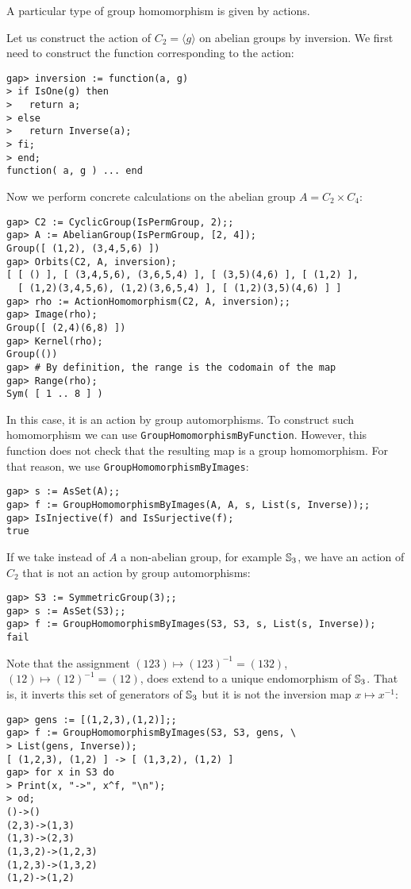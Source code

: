 A particular type of group homomorphism is given by 
actions.

\begin{example}
Let us construct the action of 
$C_2=\langle g\rangle$ on abelian groups by inversion. 
We first need to construct the function
corresponding to the action: 
\begin{lstlisting}
gap> inversion := function(a, g)
> if IsOne(g) then
>   return a;
> else
>   return Inverse(a);
> fi;
> end;
function( a, g ) ... end
\end{lstlisting}
Now we perform concrete calculations 
on the abelian group $A=C_2\times C_4$: 
\begin{lstlisting}
gap> C2 := CyclicGroup(IsPermGroup, 2);;
gap> A := AbelianGroup(IsPermGroup, [2, 4]);
Group([ (1,2), (3,4,5,6) ])
gap> Orbits(C2, A, inversion);
[ [ () ], [ (3,4,5,6), (3,6,5,4) ], [ (3,5)(4,6) ], [ (1,2) ],
  [ (1,2)(3,4,5,6), (1,2)(3,6,5,4) ], [ (1,2)(3,5)(4,6) ] ]
gap> rho := ActionHomomorphism(C2, A, inversion);;
gap> Image(rho);
Group([ (2,4)(6,8) ])
gap> Kernel(rho);
Group(())
gap> # By definition, the range is the codomain of the map   
gap> Range(rho);
Sym( [ 1 .. 8 ] )
\end{lstlisting}
In this case, it is an action by group automorphisms. To construct
such homomorphism we can use 
\lstinline{GroupHomomorphismByFunction}. However, 
this function does not check that the resulting map is a group homomorphism.
For that reason, we use \lstinline{GroupHomomorphismByImages}:
\begin{lstlisting}
gap> s := AsSet(A);;
gap> f := GroupHomomorphismByImages(A, A, s, List(s, Inverse));;
gap> IsInjective(f) and IsSurjective(f);
true
\end{lstlisting}

If we take instead of $A$ a non-abelian group, for example $\mathbb{S}_3$, we have an action 
of $C_2$ that is not an action by group automorphisms:
\begin{lstlisting}
gap> S3 := SymmetricGroup(3);;
gap> s := AsSet(S3);;
gap> f := GroupHomomorphismByImages(S3, S3, s, List(s, Inverse));
fail
\end{lstlisting}
Note that the assignment $(123)\mapsto (123)^{-1}=(132)$, $(12)\mapsto (12)^{-1}=(12)$,  does extend to a unique endomorphism of $\mathbb{S}_3$.
That is, it inverts this set of generators of $\mathbb{S}_3$ but it is not the inversion map $x\mapsto x^{-1}$:
\begin{lstlisting}
gap> gens := [(1,2,3),(1,2)];;
gap> f := GroupHomomorphismByImages(S3, S3, gens, \ 
> List(gens, Inverse));
[ (1,2,3), (1,2) ] -> [ (1,3,2), (1,2) ]
gap> for x in S3 do
> Print(x, "->", x^f, "\n");
> od;
()->()
(2,3)->(1,3)
(1,3)->(2,3)
(1,3,2)->(1,2,3)
(1,2,3)->(1,3,2)
(1,2)->(1,2)
\end{lstlisting}
\end{example}

